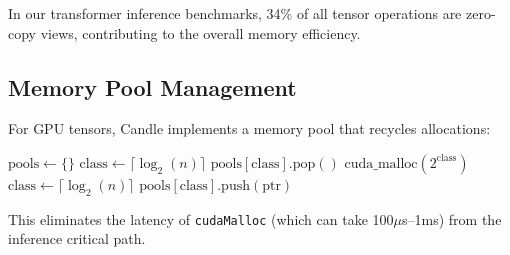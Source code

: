 In our transformer inference benchmarks, 34\% of all tensor operations are zero-copy views, contributing to the overall memory efficiency.

\subsection{Memory Pool Management}

For GPU tensors, Candle implements a memory pool that recycles allocations:

\begin{algorithm}[H]
\caption{GPU Memory Pool}
\label{alg:mempool}
\begin{algorithmic}[1]
\State $\text{pools} \gets \{\}$ 
    \State $\text{class} \gets \lceil \log_2(n) \rceil$ 
        \State \Return $\text{pools}[\text{class}].\text{pop}()$
    \EndIf
    \State \Return $\text{cuda\_malloc}(2^{\text{class}})$
\EndFunction
{}
    \State $\text{class} \gets \lceil \log_2(n) \rceil$
    \State $\text{pools}[\text{class}].\text{push}(\text{ptr})$
\EndFunction
\end{algorithmic}
\end{algorithm}

This eliminates the latency of \texttt{cudaMalloc} (which can take 100$\mu$s--1ms) from the inference critical path.

